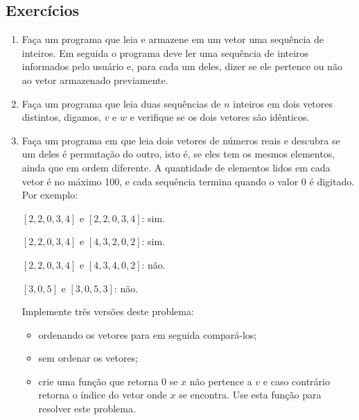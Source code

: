 \subsection{Exercícios}

\begin{enumerate}

\item Faça  um programa que leia e  armazene em um vetor  uma sequência de
inteiros.  Em seguida  o programa  deve  ler uma  sequência de  inteiros
informados pelo usuário e, para cada  um deles, dizer se ele pertence ou
não ao vetor armazenado previamente. 

\item Faça um  programa que  leia duas  sequências de  $n$ inteiros  em dois
vetores distintos,  digamos, $v$ e  $w$ e verifique  se os dois  vetores são
idênticos. 

\item Faça um programa em  que leia dois vetores de números reais
e descubra se um deles é permutação do outro, isto é, se eles
tem os mesmos elementos, ainda que em ordem diferente.
A quantidade de elementos lidos em cada vetor é no  máximo 100,  e
cada sequência termina quando o valor 0 é digitado. 
Por   exemplo: 

        $[2,2,0,3,4]$   e  $[2,2,0,3,4]$:   sim.
  
        $[2,2,0,3,4]$ e  $[4,3,2,0,2]$: sim.
        
        $[2,2,0,3,4]$ e $[4,3,4,0,2]$: não. 
        
        $[3,0,5]$ e $[3,0,5,3]$: não.

Implemente três
versões deste problema:
\begin{itemize}
\item ordenando os vetores para em seguida compará-los;
\item sem ordenar os vetores;
\item crie uma
 função que  retorna  0 se $x$  não  pertence a  $v$ e  caso contrário
 retorna o índice  do vetor onde  $x$  se encontra. Use esta função para 
 resolver este problema. 
\end{itemize}





\end{enumerate}
